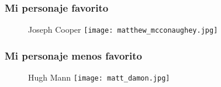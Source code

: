 \documentclass[a5paper, 11pt]{article}
\begin{document}
\subsubsection{Mi personaje favorito}
\begin{figure}[H]
\caption{\raggedleft}{Joseph Cooper}
\raggedleft
\texttt{[image: matthew\_mcconaughey.jpg]}
\end{figure}
\subsubsection{Mi personaje menos favorito}
\begin{figure}[H]
\caption{\raggedleft}{Hugh Mann}
\raggedleft
\texttt{[image: matt\_damon.jpg]}
\end{figure}
\end{document}
